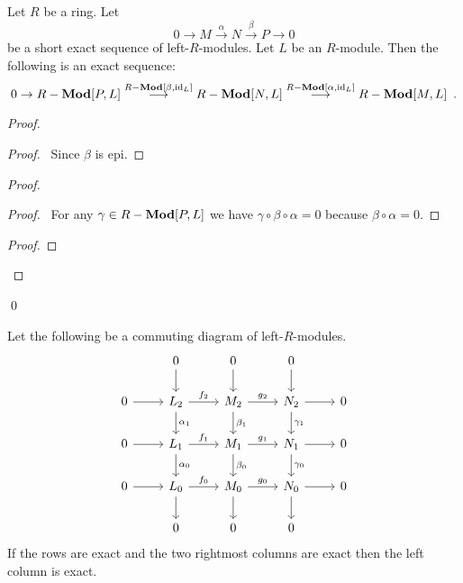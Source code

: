 \begin{prop}
Let $R$ be a ring. Let 
\[ 0 \rightarrow M \stackrel{\alpha}{\rightarrow} N \stackrel{\beta}{\rightarrow} P \rightarrow 0 \]
be a short exact sequence of left-$R$-modules. Let $L$ be an $R$-module. Then the following is an exact sequence:
\[ 0 \rightarrow {R}-\mathbf{Mod}[P,L] \stackrel{{R}-\mathbf{Mod}[\beta,\mathrm{id}_{L}]}{\longrightarrow} {R}-\mathbf{Mod}[N,L] \stackrel{{R}-\mathbf{Mod}[\alpha,\mathrm{id}_{L}]}{\longrightarrow} {R}-\mathbf{Mod}[M,L] \enspace . \]
\end{prop}

\begin{proof}
\pf
{}
\begin{proof}
	\pf\ Since $\beta$ is epi.
\end{proof}
\begin{proof}
	\begin{proof}
		\pf\ For any $\gamma \in {R}-\mathbf{Mod}[P,L]$ we have $\gamma \circ \beta \circ \alpha = 0$ because $\beta \circ \alpha = 0$.
	\end{proof}
	\begin{proof}
	\end{proof}
\end{proof}
\qed
\end{proof}

\begin{thm}
Let the following be a commuting diagram of left-$R$-modules.
\[ \begin{tikzcd}
& 0 \arrow[d] & 0 \arrow[d] & 0 \arrow[d] \\
0 \arrow[r] & L_2 \arrow[r,"f_2"] \arrow[d,"\alpha_1"] & M_2 \arrow[r,"g_2"] \arrow[d,"\beta_1"] & N_2 \arrow[r] \arrow[d,"\gamma_1"] & 0 \\
0 \arrow[r] & L_1 \arrow[r,"f_1"] \arrow[d,"\alpha_0"] & M_1 \arrow[r,"g_1"] \arrow[d,"\beta_0"] & N_1 \arrow[r] \arrow[d,"\gamma_0"] & 0 \\
0 \arrow[r] & L_0 \arrow[r,"f_0"] \arrow[d] & M_0 \arrow[r,"g_0"] \arrow[d] & N_0 \arrow[r] \arrow[d] & 0 \\
& 0 & 0 & 0
\end{tikzcd} \]
If the rows are exact and the two rightmost columns are exact then the left column is exact.
\end{thm}

